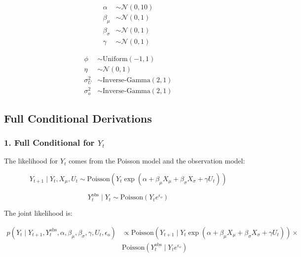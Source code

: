 \documentclass[
  letterpaper,
  DIV=11,
  numbers=noendperiod]{scrartcl}
\begin{document}
\begin{subequations}
\begin{align}
\alpha &\sim \mathcal{N}(0, 10) \\ 
\beta_{\mu} &\sim \mathcal{N}(0, 1) \\
\beta_{\sigma} &\sim \mathcal{N}(0, 1) \\ 
\gamma &\sim \mathcal{N}(0, 1)
\end{align}
\end{subequations}

\begin{subequations}
\begin{align}
\phi &\sim \text{Uniform}(-1, 1) \\ 
\eta &\sim \mathcal{N}(0, 1)  \\ 
\sigma_U^2 &\sim \text{Inverse-Gamma}(2, 1) \\
\sigma_o^2 &\sim \text{Inverse-Gamma}(2, 1) 
\end{align}
\end{subequations}

\subsection{Full Conditional
Derivations}\label{full-conditional-derivations}

\subsubsection{\texorpdfstring{1. Full Conditional for
\(Y_t\)}{1. Full Conditional for Y\_t}}\label{full-conditional-for-y_t}

The likelihood for \(Y_t\) comes from the Poisson model and the
observation model:

\begin{equation}
Y_{t+1} \mid Y_t, X_{\mu}, U_t \sim \text{Poisson}\left( Y_t \exp(\alpha + \beta_{\mu} X_{\mu} + \beta_{\sigma} X_{\sigma} + \gamma U_t) \right)
\end{equation}

\begin{equation}
Y_t^{\text{obs}} \mid Y_t \sim \text{Poisson}(Y_t e^{\epsilon_o})
\end{equation}

The joint likelihood is:

\begin{equation}
\begin{split}
p(Y_t \mid Y_{t+1}, Y_t^{\text{obs}}, \alpha, \beta_{\mu}, \beta_{\sigma}, \gamma, U_t, \epsilon_o) & \propto \text{Poisson}(Y_{t+1} \mid Y_t \exp(\alpha + \beta_{\mu} X_{\mu} + \beta_{\sigma} X_{\sigma} + \gamma U_t)) \times \\ 
& \text{Poisson}(Y_t^{\text{obs}} \mid Y_t e^{\epsilon_o})
\end{split}
\end{equation}
\end{document}
